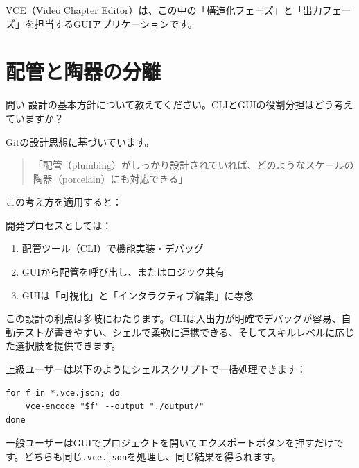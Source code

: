\documentclass[10pt,a4paper,twocolumn]{ltjsarticle}
\begin{document}
VCE（Video Chapter Editor）は、この中の「構造化フェーズ」と「出力フェーズ」を担当するGUIアプリケーションです。

\section{配管と陶器の分離}

\begin{itembox}[l]{問い}
設計の基本方針について教えてください。CLIとGUIの役割分担はどう考えていますか？
\end{itembox}

Gitの設計思想に基づいています。

\begin{quote}
「配管（plumbing）がしっかり設計されていれば、どのようなスケールの陶器（porcelain）にも対応できる」
\end{quote}

この考え方を適用すると：

\vspace{0.5\baselineskip}
\vspace{0.5\baselineskip}

開発プロセスとしては：
\begin{enumerate}
\item 配管ツール（CLI）で機能実装・デバッグ
\item GUIから配管を呼び出し、またはロジック共有
\item GUIは「可視化」と「インタラクティブ編集」に専念
\end{enumerate}

この設計の利点は多岐にわたります。CLIは入出力が明確でデバッグが容易、自動テストが書きやすい、シェルで柔軟に連携できる、そしてスキルレベルに応じた選択肢を提供できます。

上級ユーザーは以下のようにシェルスクリプトで一括処理できます：
\begin{lstlisting}
for f in *.vce.json; do
    vce-encode "$f" --output "./output/"
done
\end{lstlisting}

一般ユーザーはGUIでプロジェクトを開いてエクスポートボタンを押すだけです。どちらも同じ\texttt{.vce.json}を処理し、同じ結果を得られます。
\end{document}
